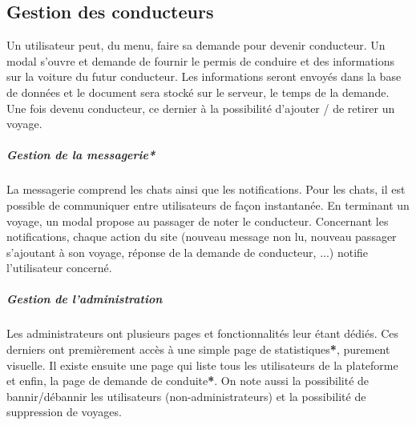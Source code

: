 \subsection{Gestion des conducteurs}

Un utilisateur peut, du menu, faire sa demande pour devenir conducteur. Un modal s'ouvre et demande de fournir le permis de conduire et des informations sur la voiture du futur conducteur. Les informations seront envoyés dans la base de données et le document sera stocké sur le serveur, le temps de la demande.
Une fois devenu conducteur, ce dernier à la possibilité d'ajouter / de retirer un voyage.

\subparagraph{Gestion de la messagerie*}

La messagerie comprend les chats ainsi que les notifications. Pour les chats, il est possible de communiquer entre utilisateurs de façon instantanée. En terminant un voyage, un modal propose au passager de noter le conducteur. Concernant les notifications, chaque action du site (nouveau message non lu, nouveau passager s'ajoutant à son voyage, réponse de la demande de conducteur, ...) notifie l'utilisateur concerné.

\subparagraph{Gestion de l'administration}

Les administrateurs ont plusieurs pages et fonctionnalités leur étant dédiés. Ces derniers ont premièrement accès à une simple page de statistiques\textbf{*}, purement visuelle. Il existe ensuite une page qui liste tous les utilisateurs de la plateforme et enfin, la page de demande de conduite\textbf{*}. On note aussi la possibilité de bannir/débannir les utilisateurs (non-administrateurs) et la possibilité de suppression de voyages. 
